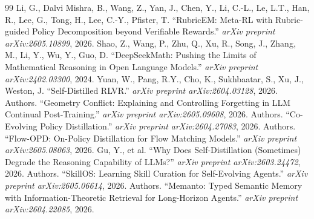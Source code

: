\documentclass[11pt,a4paper]{article}
\begin{document}
\begin{thebibliography}{99}
 Li, G., Dalvi Mishra, B., Wang, Z., Yan, J., Chen, Y., Li, C.-L., Le, L.T., Han, R., Lee, G., Tong, H., Lee, C.-Y., Pfister, T. ``RubricEM: Meta-RL with Rubric-guided Policy Decomposition beyond Verifiable Rewards.'' \textit{arXiv preprint arXiv:2605.10899}, 2026.
 Shao, Z., Wang, P., Zhu, Q., Xu, R., Song, J., Zhang, M., Li, Y., Wu, Y., Guo, D. ``DeepSeekMath: Pushing the Limits of Mathematical Reasoning in Open Language Models.'' \textit{arXiv preprint arXiv:2402.03300}, 2024.
 Yuan, W., Pang, R.Y., Cho, K., Sukhbaatar, S., Xu, J., Weston, J. ``Self-Distilled RLVR.'' \textit{arXiv preprint arXiv:2604.03128}, 2026.
 Authors. ``Geometry Conflict: Explaining and Controlling Forgetting in LLM Continual Post-Training.'' \textit{arXiv preprint arXiv:2605.09608}, 2026.
 Authors. ``Co-Evolving Policy Distillation.'' \textit{arXiv preprint arXiv:2604.27083}, 2026.
 Authors. ``Flow-OPD: On-Policy Distillation for Flow Matching Models.'' \textit{arXiv preprint arXiv:2605.08063}, 2026.
 Gu, Y., et al. ``Why Does Self-Distillation (Sometimes) Degrade the Reasoning Capability of LLMs?'' \textit{arXiv preprint arXiv:2603.24472}, 2026.
 Authors. ``SkillOS: Learning Skill Curation for Self-Evolving Agents.'' \textit{arXiv preprint arXiv:2605.06614}, 2026.
 Authors. ``Memanto: Typed Semantic Memory with Information-Theoretic Retrieval for Long-Horizon Agents.'' \textit{arXiv preprint arXiv:2604.22085}, 2026.
\end{thebibliography}
\end{document}
